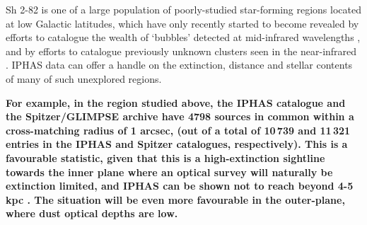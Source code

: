 \documentclass[a4paper,useAMS,usenatbib]{mn2e}
\begin{document}
Sh 2-82 is one of a large population 
of poorly-studied star-forming regions
located at low Galactic latitudes,
which have only recently started to become revealed
by efforts to catalogue the wealth of `bubbles' detected
at mid-infrared wavelengths \citep{Churchwell2006,Simpson2012},
and by efforts to catalogue previously unknown clusters seen 
in the near-infrared \cite[e.g.][]{Bica2003}.
IPHAS data can offer a handle
on the extinction, distance
and stellar contents of many of such unexplored regions.
{\bf For example,
in the region studied above,
the IPHAS catalogue and the Spitzer/GLIMPSE archive
have 4798 sources in common
within a cross-matching radius of 1 arcsec,
(out of a total of 10\,739 and 11\,321 entries in the
IPHAS and Spitzer catalogues, respectively).
This is a favourable statistic,
given that this is a high-extinction sightline towards the inner plane
where an optical survey will naturally be extinction limited,
and IPHAS can be shown not to reach beyond 4-5\,kpc \citep{Sale2014}.
The situation will be even more favourable
in the outer-plane, where dust optical depths are low.





}

\end{document}

